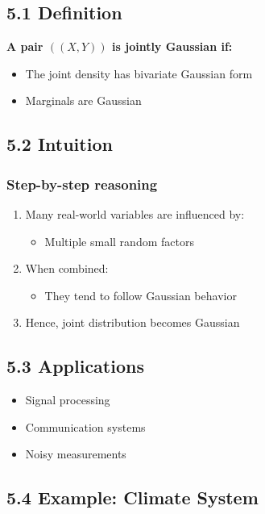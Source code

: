 \documentclass[12pt]{article}
\begin{document}
\subsection*{5.1 Definition}

\textbf{A pair $((X,Y))$ is jointly Gaussian if:}

\begin{itemize}
\item The joint density has bivariate Gaussian form
\item Marginals are Gaussian
\end{itemize}

\subsection*{5.2 Intuition}

\subsubsection*{Step-by-step reasoning}

\begin{enumerate}
\item Many real-world variables are influenced by:
\begin{itemize}
\item Multiple small random factors
\end{itemize}
\item When combined:
\begin{itemize}
\item They tend to follow Gaussian behavior
\end{itemize}
\item Hence, joint distribution becomes Gaussian
\end{enumerate}

\subsection*{5.3 Applications}

\begin{itemize}
\item Signal processing
\item Communication systems
\item Noisy measurements
\end{itemize}

\subsection*{5.4 Example: Climate System}
\end{document}
